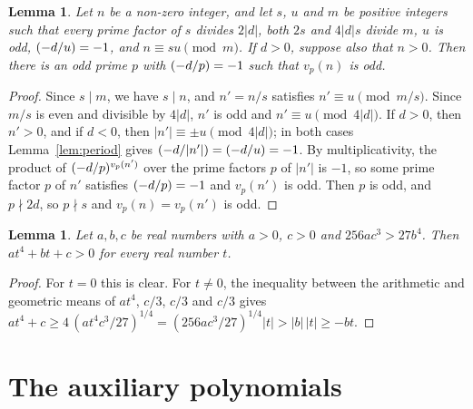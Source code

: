 \documentclass[11pt]{article}
\newtheorem{lemma}[theorem]{Lemma}
\newcommand{\leg}[2]{\mathchoice{\biggl(\dfrac{#1}{#2}\biggr)}{(#1/#2)}{(#1/#2)}{(#1/#2)}}
\begin{document}
\begin{lemma}\label{lem:odd}
Let $n$ be a non-zero integer, and let $s$, $u$ and $m$ be positive integers such that every prime factor of $s$ divides $2|d|$, both $2s$ and $4|d|s$ divide $m$, $u$ is odd, $\leg{-d}{u}=-1$, and $n\equiv su\pmod m$. If $d>0$, suppose also that $n>0$. Then there is an odd prime $p$ with $\leg{-d}{p}=-1$ such that $v_p(n)$ is odd.
\end{lemma}

\begin{proof}
Since $s\mid m$, we have $s\mid n$, and $n'=n/s$ satisfies $n'\equiv u\pmod{m/s}$. Since $m/s$ is even and divisible by $4|d|$, $n'$ is odd and $n'\equiv u\pmod{4|d|}$. If $d>0$, then $n'>0$, and if $d<0$, then $|n'|\equiv\pm u\pmod{4|d|}$; in both cases Lemma~\ref{lem:period} gives $\leg{-d}{|n'|}=\leg{-d}{u}=-1$. By multiplicativity, the product of $\leg{-d}{p}^{v_p(n')}$ over the prime factors $p$ of $|n'|$ is $-1$, so some prime factor $p$ of $n'$ satisfies $\leg{-d}{p}=-1$ and $v_p(n')$ is odd. Then $p$ is odd, and $p\nmid2d$, so $p\nmid s$ and $v_p(n)=v_p(n')$ is odd.
\end{proof}


\begin{lemma}\label{lem:amgm}
Let $a,b,c$ be real numbers with $a>0$, $c>0$ and $256ac^3>27b^4$. Then $at^4+bt+c>0$ for every real number $t$.
\end{lemma}

\begin{proof}
For $t=0$ this is clear. For $t\neq0$, the inequality between the arithmetic and geometric means of $at^4$, $c/3$, $c/3$ and $c/3$ gives $at^4+c\geq4\,(at^4c^3/27)^{1/4}=(256ac^3/27)^{1/4}|t|>|b|\,|t|\geq-bt$.
\end{proof}

\section{The auxiliary polynomials}
\end{document}
